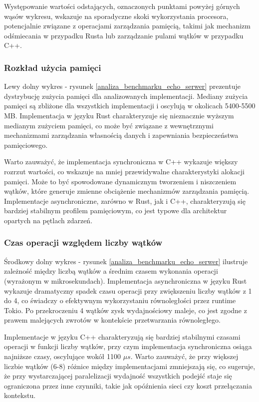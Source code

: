 Występowanie wartości odstających, oznaczonych punktami powyżej górnych wąsów wykresu, wskazuje na sporadyczne skoki wykorzystania procesora, potencjalnie związane z operacjami zarządzania pamięcią, takimi jak mechanizm odśmiecania w przypadku Rusta lub zarządzanie pulami wątków w przypadku C++.

\subsubsection{Rozkład użycia pamięci}
Lewy dolny wykres - rysunek \ref{analiza_benchmarku_echo_serwer} prezentuje dystrybucję zużycia pamięci dla analizowanych implementacji. Mediany zużycia pamięci są zbliżone dla wszystkich implementacji i oscylują w okolicach 5400-5500 MB. Implementacja w języku Rust charakteryzuje się nieznacznie wyższym medianym zużyciem pamięci, co może być związane z wewnętrznymi mechanizmami zarządzania własnością danych i zapewniania bezpieczeństwa pamięciowego.

Warto zauważyć, że implementacja synchroniczna w C++ wykazuje większy rozrzut wartości, co wskazuje na mniej przewidywalne charakterystyki alokacji pamięci. Może to być spowodowane dynamicznym tworzeniem i niszczeniem wątków, które generuje zmienne obciążenie mechanizmów zarządzania pamięcią. Implementacje asynchroniczne, zarówno w Rust, jak i C++, charakteryzują się bardziej stabilnym profilem pamięciowym, co jest typowe dla architektur opartych na pętlach zdarzeń.

\subsubsection{Czas operacji względem liczby wątków}
Środkowy dolny wykres - rysunek \ref{analiza_benchmarku_echo_serwer} ilustruje zależność między liczbą wątków a średnim czasem wykonania operacji (wyrażonym w mikrosekundach). Implementacja asynchroniczna w języku Rust wykazuje dramatyczny spadek czasu operacji przy zwiększeniu liczby wątków z 1 do 4, co świadczy o efektywnym wykorzystaniu równoległości przez runtime Tokio. Po przekroczeniu 4 wątków zysk wydajnościowy maleje, co jest zgodne z prawem malejących zwrotów w kontekście przetwarzania równoległego.

Implementacje w języku C++ charakteryzują się bardziej stabilnymi czasami operacji w funkcji liczby wątków, przy czym implementacja synchroniczna osiąga najniższe czasy, oscylujące wokół 1100 $\mu s$. Warto zauważyć, że przy większej liczbie wątków (6-8) różnice między implementacjami zmniejszają się, co sugeruje, że przy wystarczającej paralelizacji wydajność wszystkich podejść staje się ograniczona przez inne czynniki, takie jak opóźnienia sieci czy koszt przełączania kontekstu.

